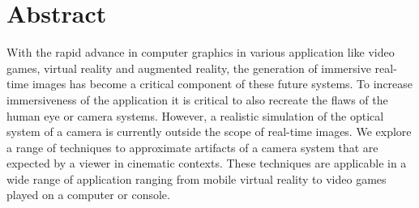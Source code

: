 \documentclass{thesisclass}
\let\cleardoublepage\clearpage
\begin{document}

\frontmatter
{}

\blankpage

\chapter*{Abstract}
With the rapid advance in computer graphics in various application like video games, virtual reality and augmented reality, the generation of immersive real-time images has become a critical component of these future systems.
To increase immersiveness of the application it is critical to also recreate the flaws of the human eye or camera systems.
However, a realistic simulation of the optical system of a camera is currently outside the scope of real-time images.
We explore a range of techniques to approximate artifacts of a camera system that are expected by a viewer in cinematic contexts.
These techniques are applicable in a wide range of application ranging from mobile virtual reality to video games played on a computer or console.

\tableofcontents
\blankpage


\mainmatter
{}


\clearpage
\printnoidxglossary[type=\acronymtype,title=Acronyms]

\cleardoublepage
{}
{}

{}	%
{}	%
												  


\end{document}
